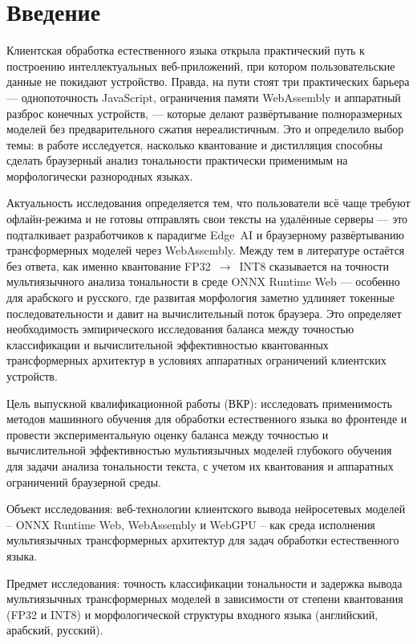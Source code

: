 \chapter*{Введение}
\label{ch:Введение}

Клиентская обработка естественного языка открыла практический путь к построению интеллектуальных веб-приложений, при котором пользовательские данные не покидают устройство. Правда, на пути стоят три практических барьера — однопоточность JavaScript, ограничения памяти WebAssembly и аппаратный разброс конечных устройств, — которые делают развёртывание полноразмерных моделей без предварительного сжатия нереалистичным. Это и определило выбор темы: в работе исследуется, насколько квантование и дистилляция способны сделать браузерный анализ тональности практически применимым на морфологически разнородных языках.

Актуальность исследования определяется тем, что пользователи всё чаще требуют офлайн-режима и не готовы отправлять свои тексты на удалённые серверы — это подталкивает разработчиков к парадигме Edge~AI и браузерному развёртыванию трансформерных моделей через WebAssembly. Между тем в литературе остаётся без ответа, как именно квантование FP32~$\rightarrow$~INT8 сказывается на точности мультиязычного анализа тональности в среде ONNX Runtime Web — особенно для арабского и русского, где развитая морфология заметно удлиняет токенные последовательности и давит на вычислительный поток браузера. Это определяет необходимость эмпирического исследования баланса между точностью классификации и вычислительной эффективностью квантованных трансформерных архитектур в условиях аппаратных ограничений клиентских устройств.

Цель выпускной квалификационной работы (ВКР): исследовать применимость методов машинного обучения для обработки естественного языка во фронтенде и провести экспериментальную оценку баланса между точностью и вычислительной эффективностью мультиязычных моделей глубокого обучения для задачи анализа тональности текста, с учетом их квантования и аппаратных ограничений браузерной среды.

Объект исследования: веб-технологии клиентского вывода нейросетевых моделей – ONNX Runtime Web, WebAssembly и WebGPU – как среда исполнения мультиязычных трансформерных архитектур для задач обработки естественного языка.

Предмет исследования: точность классификации тональности и задержка вывода мультиязычных трансформерных моделей в зависимости от степени квантования (FP32 и INT8) и морфологической структуры входного языка (английский, арабский, русский).

